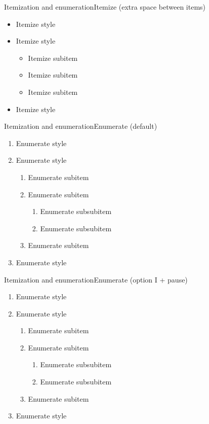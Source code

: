 \documentclass[aspectratio=169, 11pt]{beamer}
\begin{document}
\begin{frame}{Itemization and enumeration}{Itemize (extra space between items)}
\begin{itemize}
	\itemsep 20pt
	\item Itemize style
	\item Itemize style
	\begin{itemize}
		\itemsep 10pt
		\item Itemize subitem
		\item Itemize subitem
		\item Itemize subitem	
	\end{itemize}
	\item Itemize style
\end{itemize}
\end{frame}


\begin{frame}{Itemization and enumeration}{Enumerate (default)}
\begin{enumerate}
	\item Enumerate style
	\item Enumerate style
	\begin{enumerate}
		\item Enumerate subitem
		\item Enumerate subitem
		\begin{enumerate}
			\item Enumerate subsubitem
			\item Enumerate subsubitem
		\end{enumerate}
		\item Enumerate subitem
	\end{enumerate}
	\item Enumerate style
\end{enumerate}
\end{frame}


\begin{frame}{Itemization and enumeration}{Enumerate (option I + pause)}
\begin{enumerate}[I]
	\item Enumerate style
	\item Enumerate style
	\begin{enumerate}[I]
		\item Enumerate subitem
		\item Enumerate subitem
		\pause
		\begin{enumerate}[I]
			\item Enumerate subsubitem
			\item Enumerate subsubitem
		\end{enumerate}
		\pause
		\item Enumerate subitem
	\end{enumerate}
	\item Enumerate style
\end{enumerate}
\end{frame}
\end{document}
